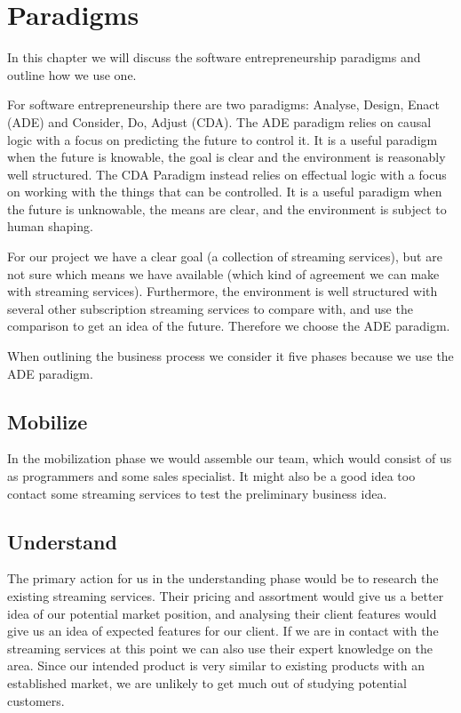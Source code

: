 \section{Paradigms}
\label{sec:paradigms}
In this chapter we will discuss the software entrepreneurship paradigms and outline how we use one.

For software entrepreneurship there are two paradigms: Analyse, Design, Enact (ADE) and Consider, Do, Adjust (CDA).
The ADE paradigm relies on causal logic with a focus on predicting the future to control it.
It is a useful paradigm when the future is knowable, the goal is clear and the environment is reasonably well structured.
The CDA Paradigm instead relies on effectual logic with a focus on working with the things that can be controlled.
It is a useful paradigm when the future is unknowable, the means are clear, and the environment is subject to human shaping.

For our project we have a clear goal (a collection of streaming services), but are not sure which means we have available (which kind of agreement we can make with streaming services).
Furthermore, the environment is well structured with several other subscription streaming services to compare with, and use the comparison to get an idea of the future.
Therefore we choose the ADE paradigm.

When outlining the business process we consider it five phases because we use the ADE paradigm.

\subsection{Mobilize}
In the mobilization phase we would assemble our team, which would consist of us as programmers and some sales specialist. It might also be a good idea too contact some streaming services to test the preliminary business idea.

\subsection{Understand}
The primary action for us in the understanding phase would be to research the existing streaming services. Their pricing and assortment would give us a better idea of our potential market position, and analysing their client features would give us an idea of expected features for our client.
If we are in contact with the streaming services at this point we can also use their expert knowledge on the area.
Since our intended product is very similar to existing products with an established market, we are unlikely to get much out of studying potential customers.

